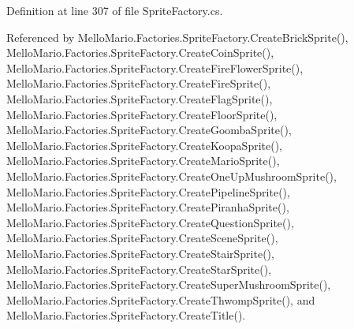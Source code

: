 Definition at line 307 of file Sprite\+Factory.\+cs.



Referenced by Mello\+Mario.\+Factories.\+Sprite\+Factory.\+Create\+Brick\+Sprite(), Mello\+Mario.\+Factories.\+Sprite\+Factory.\+Create\+Coin\+Sprite(), Mello\+Mario.\+Factories.\+Sprite\+Factory.\+Create\+Fire\+Flower\+Sprite(), Mello\+Mario.\+Factories.\+Sprite\+Factory.\+Create\+Fire\+Sprite(), Mello\+Mario.\+Factories.\+Sprite\+Factory.\+Create\+Flag\+Sprite(), Mello\+Mario.\+Factories.\+Sprite\+Factory.\+Create\+Floor\+Sprite(), Mello\+Mario.\+Factories.\+Sprite\+Factory.\+Create\+Goomba\+Sprite(), Mello\+Mario.\+Factories.\+Sprite\+Factory.\+Create\+Koopa\+Sprite(), Mello\+Mario.\+Factories.\+Sprite\+Factory.\+Create\+Mario\+Sprite(), Mello\+Mario.\+Factories.\+Sprite\+Factory.\+Create\+One\+Up\+Mushroom\+Sprite(), Mello\+Mario.\+Factories.\+Sprite\+Factory.\+Create\+Pipeline\+Sprite(), Mello\+Mario.\+Factories.\+Sprite\+Factory.\+Create\+Piranha\+Sprite(), Mello\+Mario.\+Factories.\+Sprite\+Factory.\+Create\+Question\+Sprite(), Mello\+Mario.\+Factories.\+Sprite\+Factory.\+Create\+Scene\+Sprite(), Mello\+Mario.\+Factories.\+Sprite\+Factory.\+Create\+Stair\+Sprite(), Mello\+Mario.\+Factories.\+Sprite\+Factory.\+Create\+Star\+Sprite(), Mello\+Mario.\+Factories.\+Sprite\+Factory.\+Create\+Super\+Mushroom\+Sprite(), Mello\+Mario.\+Factories.\+Sprite\+Factory.\+Create\+Thwomp\+Sprite(), and Mello\+Mario.\+Factories.\+Sprite\+Factory.\+Create\+Title().


